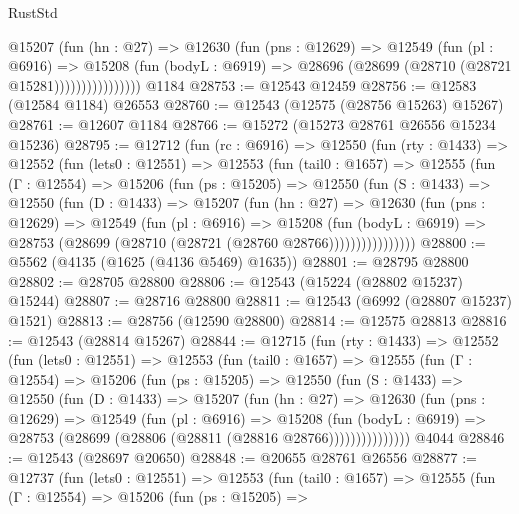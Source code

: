 \begin{lexlean}{RustStd}
\begin{coremodule}
                    @15207
                      (fun (hn : @27) =>
                      @12630
                        (fun (pns : @12629) =>
                        @12549
                          (fun (pl : @6916) =>
                          @15208
                            (fun (bodyL : @6919) =>
                            @28696 (@28699 (@28710 (@28721 @15281))))))))))))))))
    @1184
@28753 := @12543 @12459
@28756 := @12583 (@12584 @1184) @26553
@28760 := @12543 (@12575 (@28756 @15263) @15267)
@28761 := @12607 @1184
@28766 := @15272 (@15273 @28761 @26556 @15234 @15236)
@28795 := @12712
    (fun (rc : @6916) =>
    @12550
      (fun (rty : @1433) =>
      @12552
        (fun (lets0 : @12551) =>
        @12553
          (fun (tail0 : @1657) =>
          @12555
            (fun (Γ : @12554) =>
            @15206
              (fun (ps : @15205) =>
              @12550
                (fun (S : @1433) =>
                @12550
                  (fun (D : @1433) =>
                  @15207
                    (fun (hn : @27) =>
                    @12630
                      (fun (pns : @12629) =>
                      @12549
                        (fun (pl : @6916) =>
                        @15208
                          (fun (bodyL : @6919) =>
                          @28753 (@28699 (@28710 (@28721 (@28760 @28766))))))))))))))))
@28800 := @5562 (@4135 (@1625 (@4136 @5469) @1635))
@28801 := @28795 @28800
@28802 := @28705 @28800
@28806 := @12543 (@15224 (@28802 @15237) @15244)
@28807 := @28716 @28800
@28811 := @12543 (@6992 (@28807 @15237) @1521)
@28813 := @28756 (@12590 @28800)
@28814 := @12575 @28813
@28816 := @12543 (@28814 @15267)
@28844 := @12715
    (fun (rty : @1433) =>
    @12552
      (fun (lets0 : @12551) =>
      @12553
        (fun (tail0 : @1657) =>
        @12555
          (fun (Γ : @12554) =>
          @15206
            (fun (ps : @15205) =>
            @12550
              (fun (S : @1433) =>
              @12550
                (fun (D : @1433) =>
                @15207
                  (fun (hn : @27) =>
                  @12630
                    (fun (pns : @12629) =>
                    @12549
                      (fun (pl : @6916) =>
                      @15208
                        (fun (bodyL : @6919) =>
                        @28753 (@28699 (@28806 (@28811 (@28816 @28766)))))))))))))))
    @4044
@28846 := @12543 (@28697 @20650)
@28848 := @20655 @28761 @26556
@28877 := @12737
    (fun (lets0 : @12551) =>
    @12553
      (fun (tail0 : @1657) =>
      @12555
        (fun (Γ : @12554) =>
        @15206
          (fun (ps : @15205) =>

\end{coremodule}
\end{lexlean}
